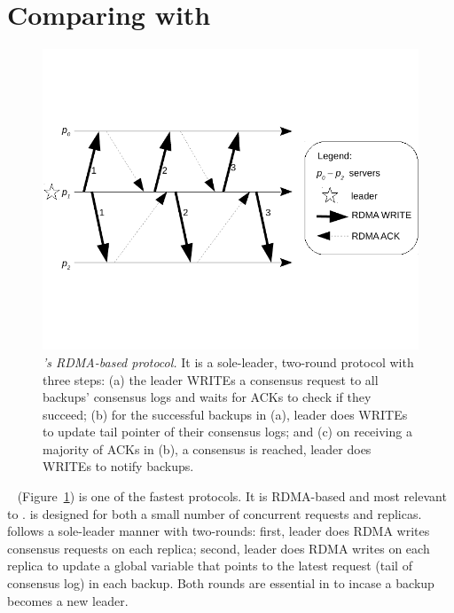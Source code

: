 % 

\section{Comparing \xxx with \dare}\label{sec:compare}

\begin{figure}[t]
\centering
\vspace{-.4in}
\includegraphics[width=.35\textwidth]{figures/dare_algo}
\vspace{-.53in}
\caption{{\em \dare's RDMA-based protocol.} It is a sole-leader, 
two-round protocol with three steps: (a) the leader WRITEs a consensus request 
to all backups' consensus logs and waits for ACKs to check if they succeed; 
(b) for the successful backups in (a), leader does WRITEs to update tail 
pointer of their consensus logs; and (c) on receiving a majority of ACKs in 
(b), a consensus is reached, leader does WRITEs to notify backups.}
\label{fig:dare}
\vspace{-.20in}
\end{figure}

\dare~\cite{dare:hpdc15} (Figure~\ref{fig:dare}) is one of 
the fastest \paxos protocols. It is RDMA-based and most relevant to \xxx. \dare 
is designed for both a small number of concurrent requests and 
replicas. \dare follows a sole-leader manner with two-rounds: 
first, leader does RDMA writes consensus requests on each replica; second, 
leader does RDMA writes on each replica to update a global variable that points 
to the latest request (tail of consensus log) in each backup. Both rounds are 
essential in \dare to incase a backup becomes a new leader.

% 

